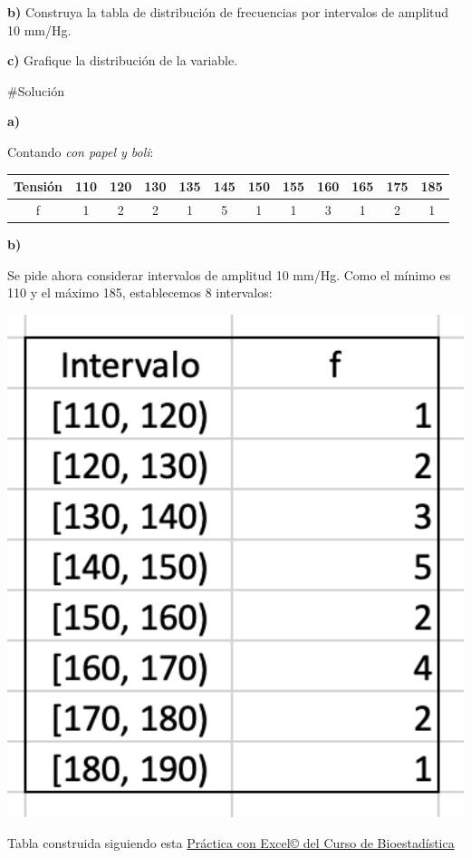 \documentclass[
]{book}
\begin{document}
\textbf{b)} Construya la tabla de distribución de frecuencias por intervalos de amplitud 10 mm/Hg.

\textbf{c)} Grafique la distribución de la variable.

\#Solución

\textbf{a)}

Contando \emph{con papel y boli}:

\begin{longtable}[]{@{}cccccccccccc@{}}
\toprule
Tensión & 110 & 120 & 130 & 135 & 145 & 150 & 155 & 160 & 165 & 175 & 185\tabularnewline
\midrule
\endhead
f & 1 & 2 & 2 & 1 & 5 & 1 & 1 & 3 & 1 & 2 & 1\tabularnewline
\bottomrule
\end{longtable}

\textbf{b)}

Se pide ahora considerar intervalos de amplitud 10 mm/Hg. Como el mínimo es 110 y el máximo 185, establecemos 8 intervalos:

\includegraphics[width=5.28in]{img/1_6}

Tabla construida siguiendo esta \href{https://1fjmanzano.github.io/bioestadistica/tablas-de-frecuencias.html\#tablas-de-frecuencias-pr\%C3\%A1ctica-3-con-excel}{Práctica con Excel© del Curso de Bioestadística}
\end{document}
